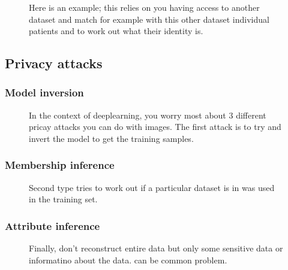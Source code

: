 \documentclass[11pt]{article}
\begin{document}
\begin{figure}[H]
    \centering
    \caption{Here is an example; this relies on you having access to another dataset and match for example with this other dataset individual patients and to work out what their identity is.}
\end{figure}

\subsection{Privacy attacks}

\subsubsection{Model inversion}

\begin{figure}[H]
    \centering
    \caption{In the context of deeplearning, you worry most about 3 different pricay attacks you can do with images. The first attack is to try and invert the model to get the training samples. }
\end{figure}

\subsubsection{Membership inference}

\begin{figure}[H]
    \centering
    \caption{Second type tries to work out if a particular dataset is in was used in the training set.}
\end{figure}

\subsubsection{Attribute inference}

\begin{figure}[H]
    \centering
    \caption{Finally, don't reconstruct entire data but only some sensitive data or informatino about the data. can be common problem.}
\end{figure}
\end{document}
